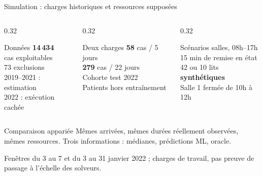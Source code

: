 \documentclass[aspectratio=169,10pt]{beamer}
\newcommand{\source}[1]{\par\vfill{\color{McmMuted}\tiny #1}}
\begin{document}
\begin{frame}{Simulation : charges historiques et ressources supposées}
  \small
  \begin{columns}[T,onlytextwidth]
    \begin{column}{0.32\textwidth}
      \begin{block}{Données}
        \centering
        {\Large\bfseries 14\,434}\\
        cas exploitables\\[5pt]
        73 exclusions\\[5pt]
        2019--2021 : estimation\\
        2022 : exécution cachée
      \end{block}
    \end{column}
    \begin{column}{0.32\textwidth}
      \begin{block}{Deux charges}
        \centering
        {\Large\bfseries 58} cas / 5 jours\\[5pt]
        {\Large\bfseries 279} cas / 22 jours\\[5pt]
        Cohorte test 2022\\
        Patients hors entraînement
      \end{block}
    \end{column}
    \begin{column}{0.32\textwidth}
      \begin{block}{Scénarios}
         salles, 08h--17h\\
        15 min de remise en état\\[5pt]
        42 ou 10 lits \textbf{synthétiques}\\
        Salle 1 fermée de 10h à 12h
      \end{block}
    \end{column}
  \end{columns}
  \vspace{0.23cm}
  \begin{exampleblock}{Comparaison appariée}
    \small Mêmes arrivées, mêmes durées réellement observées, mêmes
    ressources. Trois informations : médianes, prédictions ML, oracle.
  \end{exampleblock}
  \source{Fenêtres du 3 au 7 et du 3 au 31 janvier 2022 ; charges de travail, pas preuve de passage à l'échelle des solveurs.}
\end{frame}
\end{document}
